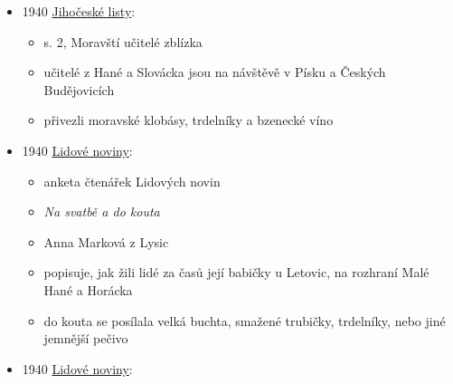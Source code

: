 \begin{itemize}
  \begin{itemize}
  \tightlist
  \item
     jsou část Vyškova, trdelníky dostávali dělníci
    po žních jako výslužku
  \end{itemize}
\item
  1940
  \href{https://ceskadigitalniknihovna.cz/uuid/uuid:c6220b36-bdd1-4eec-94b2-2bed755a042a}{Jihočeské
  listy}:

  \begin{itemize}
  \tightlist
  \item
    s. 2, Moravští učitelé zblízka
  \item
    učitelé z Hané a Slovácka jsou na návštěvě v Písku a Českých
    Budějovicích
  \item
    přivezli moravské klobásy, trdelníky a bzenecké víno
  \end{itemize}
\item
  1940
  \href{https://ceskadigitalniknihovna.cz/uuid/uuid:9582fdd0-6e03-11dd-a59e-000d606f5dc6}{Lidové
  noviny}:

  \begin{itemize}
  \tightlist
  \item
    anketa čtenářek Lidových novin
  \item
    \emph{Na svatbě a do kouta}
  \item
    Anna Marková z Lysic 
  \item
    popisuje, jak žili lidé za časů její babičky u Letovic, na rozhraní
    Malé Hané a Horácka
  \item
    do kouta se posílala velká buchta, smažené trubičky, trdelníky, nebo
    jiné jemnější pečivo
  \end{itemize}
\item
  1940
  \href{https://ndk.cz/uuid/uuid:d4d8b490-5768-11dd-bd71-000d606f5dc6}{Lidové
  noviny}:


\end{itemize}
